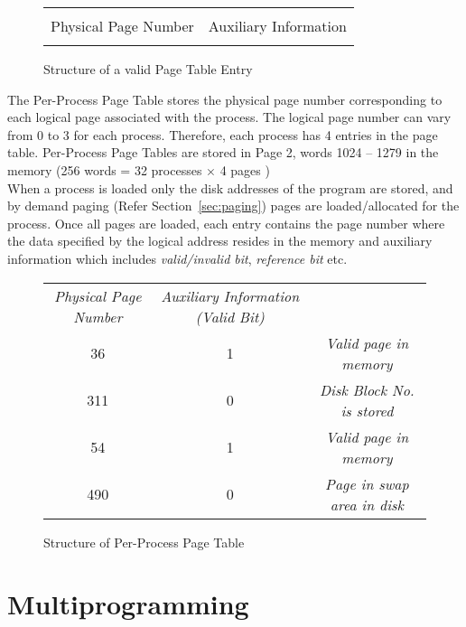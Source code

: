 \documentclass[10pt]{report}
\begin{document}
		\begin{figure}[htp!]
		\centering
		\begin{tabular}{|c|c|}
		\hline
		  	 	& 			\\ 
		 	Physical Page Number & Auxiliary Information  \\
			 	& 			\\  \hline
		\end{tabular}
		\caption{Structure of a valid Page Table Entry}
		\label{fig:pagetable}
	\end{figure}


The Per-Process Page Table stores the physical page number corresponding to each logical page associated with the process. The logical page number can vary from 0 to 3 for each process.  Therefore, each process has 4 entries in the page table. Per-Process Page Tables are stored in Page 2, words 1024 -- 1279 in the memory (256 words = 32 processes $\times$ 4 pages )\\

When a process is loaded only the disk addresses of the program are stored, and by demand paging (Refer Section~\ref{sec:paging}) pages are loaded/allocated for the process.	 Once all pages are loaded, each entry contains the page number where the data specified by the logical address resides in the memory and auxiliary information which includes \textit{valid/invalid bit}, \textit{reference bit} etc.

		\begin{figure}[htp!]
		\centering
		\begin{tabular}{|c|c|c}
			\textit{Physical Page Number} & \textit{Auxiliary Information (Valid Bit)} \\
			\cline{0-1}
			36 & 1  & \footnotesize \textit{ {Valid page in memory}}\\
			\cline{0-1}
			311 & 0 & \footnotesize \textit{ {Disk Block No. is stored }}\\
			\cline{0-1}
			54 &  1 & \footnotesize \textit{ {Valid page in memory}}\\
			\cline{0-1}
			490 & 0 & \footnotesize \textit{ {Page in swap area in disk}}\\
			\cline{0-1}
		\end{tabular}
		\caption{Structure of Per-Process Page Table}
		\label{fig:processfile table}
	\end{figure}
	
\section{Multiprogramming}
\label{sec:multiprogramming}
	
\end{document}
